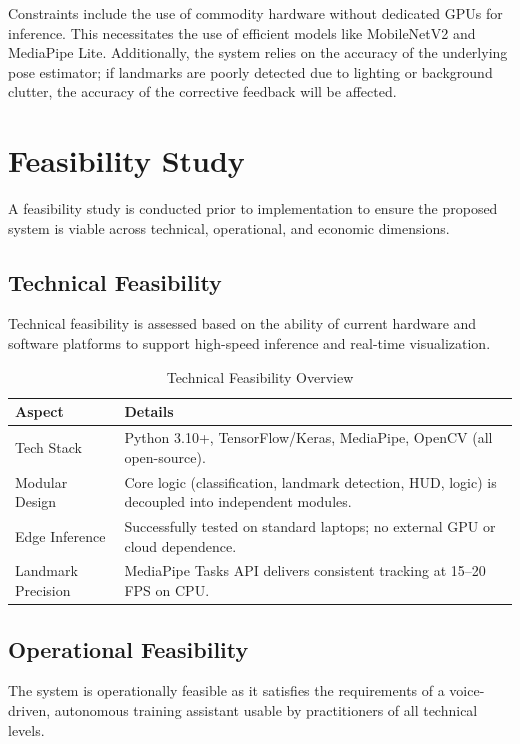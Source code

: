 Constraints include the use of commodity hardware without dedicated GPUs for inference. This necessitates the use of efficient models like MobileNetV2 and MediaPipe Lite. Additionally, the system relies on the accuracy of the underlying pose estimator; if landmarks are poorly detected due to lighting or background clutter, the accuracy of the corrective feedback will be affected.

\section{Feasibility Study}
A feasibility study is conducted prior to implementation to ensure the proposed system is viable across technical, operational, and economic dimensions.

\subsection{Technical Feasibility}
Technical feasibility is assessed based on the ability of current hardware and software platforms to support high-speed inference and real-time visualization.

\begin{table}[H]
    \centering
    \caption{Technical Feasibility Overview}
    \begin{tabular}{|p{}|p{}|}
        \hline
        \textbf{Aspect} & \textbf{Details} \\
        \hline
        Tech Stack & Python 3.10+, TensorFlow/Keras, MediaPipe, OpenCV (all open-source). \\
        \hline
        Modular Design & Core logic (classification, landmark detection, HUD, logic) is decoupled into independent modules. \\
        \hline
        Edge Inference & Successfully tested on standard laptops; no external GPU or cloud dependence. \\
        \hline
        Landmark Precision & MediaPipe Tasks API delivers consistent tracking at 15--20 FPS on CPU. \\
        \hline
    \end{tabular}
    \label{tab:techfeas}
\end{table}

\subsection{Operational Feasibility}
The system is operationally feasible as it satisfies the requirements of a voice-driven, autonomous training assistant usable by practitioners of all technical levels.

